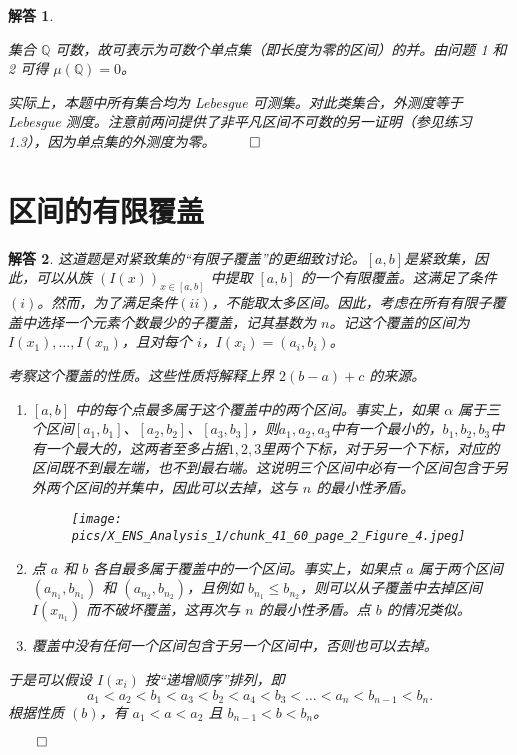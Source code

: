 \documentclass[12pt,UTF8]{ctexbook}
\theoremstyle{exercisestyle}
\theoremstyle{solutionstyle}
\newtheorem*{solution*}{解答}
\newenvironment{solution}
  {\begin{solution*}}
  {\hfill\ensuremath{\qed}\end{solution*}}
\begin{document}
\begin{solution}
\begin{subquestions}
\item 集合 \(\mathbb{Q}\) 可数，故可表示为可数个单点集（即长度为零的区间）的并。由问题 1 和 2 可得 \(\mu(\mathbb{Q}) = 0\)。
\end{subquestions}
实际上，本题中所有集合均为 Lebesgue 可测集。对此类集合，外测度等于 Lebesgue 测度。注意前两问提供了非平凡区间不可数的另一证明（参见练习 1.3），因为单点集的外测度为零。
\end{solution}

\section{区间的有限覆盖}
\begin{solution}
  这道题是对紧致集的“有限子覆盖”的更细致讨论。$[a, b]$是紧致集，因此，可以从族 \((I(x))_{x\in[a,b]}\) 中提取 \([a, b]\) 的一个有限覆盖。这满足了条件$(i)$。然而，为了满足条件$(ii)$，不能取太多区间。因此，考虑在所有有限子覆盖中选择一个元素个数最少的子覆盖，记其基数为 \(n\)。记这个覆盖的区间为 \(I(x_1), \ldots, I(x_n)\)，且对每个 \(i\)，\(I(x_i) = (a_i, b_i)\)。

考察这个覆盖的性质。这些性质将解释上界 \(2(b-a)+c\) 的来源。
\begin{enumerate}[label=(\textit{\alph*})]
  \item  \([a, b]\) 中的每个点最多属于这个覆盖中的两个区间。事实上，如果 \(\alpha\) 属于三个区间$[a_1, b_1]$、$[a_2, b_2]$、$[a_3, b_3]$，则$a_1, a_2, a_3$中有一个最小的，$b_1, b_2, b_3$中有一个最大的，这两者至多占据$1,2,3$里两个下标，对于另一个下标，对应的区间既不到最左端，也不到最右端。这说明三个区间中必有一个区间包含于另外两个区间的并集中，因此可以去掉，这与 \(n\) 的最小性矛盾。
  \begin{figure}[htbp]
    \centering
    \texttt{[image: pics/X\_ENS\_Analysis\_1/chunk\_41\_60\_page\_2\_Figure\_4.jpeg]}
  \end{figure}
  \item 点 \(a\) 和 \(b\) 各自最多属于覆盖中的一个区间。事实上，如果点 \(a\) 属于两个区间 \((a_{n_1}, b_{n_1})\) 和 \((a_{n_2}, b_{n_2})\)，且例如 \(b_{n_1} \leqslant b_{n_2}\)，则可以从子覆盖中去掉区间 \(I(x_{n_1})\) 而不破坏覆盖，这再次与 \(n\) 的最小性矛盾。点 \(b\) 的情况类似。
  \item 覆盖中没有任何一个区间包含于另一个区间中，否则也可以去掉。
\end{enumerate}

于是可以假设 \(I(x_i)\) 按“递增顺序”排列，即
\[
a_1 < a_2 < b_1 < a_3 < b_2 < a_4 < b_3 < \dots < a_n < b_{n-1} < b_n.
\]
根据性质 $(b)$，有 \(a_1 < a < a_2\) 且 \(b_{n-1} < b < b_n\)。


\end{solution}
\end{document}
